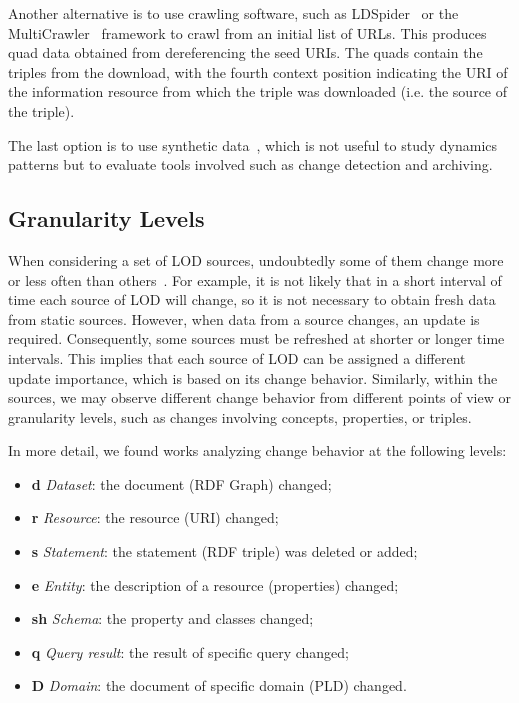 \documentclass[sw]{iosart2x}
\begin{document}
Another alternative is to use crawling software, such as LDSpider~\cite{IseleUBH10} or the MultiCrawler~\cite{HarthUD06} framework to crawl from an initial list of URLs. This produces quad data obtained from dereferencing the seed URIs. The quads contain the triples from the download, with the fourth context position indicating the URI of the information resource from which the triple was downloaded (i.e. the source of the triple).

The last option is to use synthetic data~\cite {MeimarisP16}, which is not useful to study dynamics patterns but to evaluate tools involved such as change detection and archiving.

\subsection{Granularity Levels}\label{Granularity}

When considering a set of LOD sources, undoubtedly some of them change more or less often than others~\cite{KaferAUOH13, DividinoGSG14}. For example, it is not likely that in a short interval of time each source of LOD will change, so it is not necessary to obtain fresh data from static sources. However, when data from a source changes, an update is required. Consequently, some sources must be refreshed at shorter or longer time intervals. This implies that each source of LOD can be assigned a different update importance, which is based on its change behavior. Similarly, within the sources, we may observe different change behavior from different points of view or granularity levels, such as changes involving concepts, properties, or triples.

In more detail, we found works analyzing change behavior at the following levels:
\begin{itemize}
	\item \textbf{d} \textit{Dataset}: the document (RDF Graph) changed;
	\item \textbf{r} \textit{Resource}: the resource (URI) changed;
	\item \textbf{s} \textit{Statement}: the statement (RDF triple) was deleted or added;
	\item \textbf{e} \textit{Entity}: the description of a resource (properties) changed;
	\item \textbf{sh} \textit{Schema}: the property and classes changed;
	\item \textbf{q} \textit{Query result}: the result of specific query changed;
	\item \textbf{D} \textit{Domain}: the document of specific domain (PLD) changed.
\end{itemize}
\end{document}
